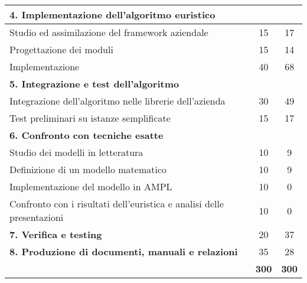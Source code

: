 \begin{table}[!h]
\begin{widepage}
\begin{tabularx}{\textwidth}{|X|c|c|}
            \hline \hline
            \multicolumn{3}{|l|}{\textbf{4. Implementazione dell'algoritmo euristico}}\\
            \hline
            Studio ed assimilazione del framework aziendale & 15 &17\\
            \hline
            Progettazione dei moduli & 15 & 14\\
            \hline
            Implementazione & 40 & 68\\
            
            \hline \hline
            \multicolumn{3}{|l|}{\textbf{5. Integrazione e test dell’algoritmo}}\\
            \hline
            Integrazione dell’algoritmo nelle librerie dell’azienda & 30 & 49\\
            \hline
            Test preliminari su istanze semplificate & 15 & 17\\
            
            \hline \hline
            \multicolumn{3}{|l|}{\textbf{6. Confronto con tecniche esatte}}\\
            \hline
            Studio dei modelli in letteratura & 10 & 9\\
            \hline
            Definizione di un modello matematico & 10 & 9\\
            \hline
            Implementazione del modello in AMPL & 10 & 0\\
            \hline
            Confronto con i risultati dell'euristica e analisi delle presentazioni & 10 & 0\\
            
            \hline \hline 
            \textbf{7. Verifica e testing} & 20 & 37\\
            
            \hline \hline
            \textbf{8. Produzione di documenti, manuali e relazioni} & 35 & 28\\
            \hline \hline
            \multicolumn{1}{X|}{} & {\Large \textbf{300}} & {\Large \textbf{300}}\\
            \cline{2-3}
        \end{tabularx}
    \end{widepage}
\end{table}%

\FloatBarrier
\noindent

